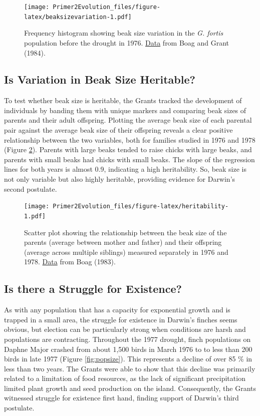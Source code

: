 \documentclass[
]{book}
\begin{document}
\begin{figure}
\centering
\texttt{[image: Primer2Evolution\_files/figure-latex/beaksizevariation-1.pdf]}
\caption{\label{fig:beaksizevariation}Frequency histogram showing beak size variation in the \emph{G. fortis} population before the drought in 1976. \href{data/3_beak_size_variation.csv}{Data} from Boag and Grant (1984).}
\end{figure}

\hypertarget{is-variation-in-beak-size-heritable}{%
\subsection{Is Variation in Beak Size Heritable?}\label{is-variation-in-beak-size-heritable}}

To test whether beak size is heritable, the Grants tracked the development of individuals by banding them with unique markers and comparing beak sizes of parents and their adult offspring. Plotting the average beak size of each parental pair against the average beak size of their offspring reveals a clear positive relationship between the two variables, both for families studied in 1976 and 1978 (Figure \ref{fig:heritability}). Parents with large beaks tended to raise chicks with large beaks, and parents with small beaks had chicks with small beaks. The slope of the regression lines for both years is almost 0.9, indicating a high heritability. So, beak size is not only variable but also highly heritable, providing evidence for Darwin's second postulate.

\begin{figure}
\centering
\texttt{[image: Primer2Evolution\_files/figure-latex/heritability-1.pdf]}
\caption{\label{fig:heritability}Scatter plot showing the relationship between the beak size of the parents (average between mother and father) and their offspring (average across multiple siblings) measured separately in 1976 and 1978. \href{data/3_parent_offspring.csv}{Data} from Boag (1983).}
\end{figure}

\hypertarget{is-there-a-struggle-for-existence}{%
\subsection{Is there a Struggle for Existence?}\label{is-there-a-struggle-for-existence}}

As with any population that has a capacity for exponential growth and is trapped in a small area, the struggle for existence in Darwin's finches seems obvious, but election can be particularly strong when conditions are harsh and populations are contracting. Throughout the 1977 drought, finch populations on Daphne Major crashed from about 1,500 birds in March 1976 to to less than 200 birds in late 1977 (Figure \ref{fig:popsize}). This represents a decline of over 85 \% in less than two years. The Grants were able to show that this decline was primarily related to a limitation of food resources, as the lack of significant precipitation limited plant growth and seed production on the island. Consequently, the Grants witnessed struggle for existence first hand, finding support of Darwin's third postulate.
\end{document}
